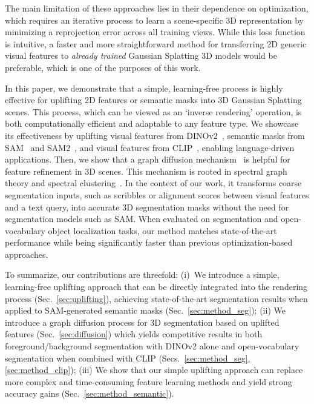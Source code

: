 The main limitation of these approaches lies in their dependence on optimization, which requires an iterative process to learn a scene-specific 3D representation by minimizing a reprojection error across all training views. While this loss function is intuitive, a faster and more straightforward method for transferring 2D generic visual features to \emph{already trained} Gaussian Splatting 3D models would be preferable, which is one of the purposes of this work.

In this paper, we demonstrate that a simple, learning-free process is highly effective for uplifting 2D features or semantic masks into 3D Gaussian Splatting scenes. This process, which can be viewed as an `inverse rendering' operation, is both computationally efficient and adaptable to any feature type. We showcase its effectiveness by uplifting visual features from DINOv2~\citep{oquab2024dinov2, darcet2024registers}, semantic masks from SAM~\citep{kirillov2023sam} and SAM2~\citep{ravi2024sam2}, and visual features from CLIP~\citep{ilharco2021openclip}, enabling language-driven applications.
Then, we show that a graph diffusion mechanism~\citep{kondor2002diffusion,smola2003kernels} is helpful for feature refinement in 3D scenes. This mechanism is rooted in spectral graph theory and spectral clustering~\citep{belkin2001laplacian,shi2000normalized,meila2000learning}.
In the context of our work, it transforms coarse segmentation inputs, such as scribbles or alignment scores between visual features and a text query, into accurate 3D segmentation masks without the need for segmentation models such as SAM.
When evaluated on segmentation and open-vocabulary object localization tasks, our method matches state-of-the-art performance while being significantly faster than previous optimization-based approaches.

To summarize, our contributions are threefold: (i)~We introduce a simple, learning-free uplifting approach that can be directly integrated into the rendering process (Sec.~\ref{sec:uplifting}), achieving state-of-the-art segmentation results when applied to SAM-generated semantic masks (Sec.~\ref{sec:method_seg}); 
(ii) We introduce a graph diffusion process for 3D segmentation based on uplifted features (Sec.~\ref{sec:diffusion}) which yields competitive results in both foreground/background segmentation with DINOv2 alone and open-vocabulary segmentation when combined with CLIP (Secs.~\ref{sec:method_seg}, \ref{sec:method_clip});
(iii) We show that our simple uplifting approach can replace more complex and time-consuming feature learning methods and yield strong accuracy gains (Sec.~\ref{sec:method_semantic}).